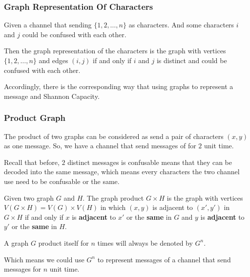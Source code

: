 \begin{frame}
      \frametitle{Graph Representation Of Characters}
      \begin{definition}\label{def:graphRepresetationOfChannel}
            Given a channel that sending $\{1,2,\dots,n\}$ as characters. And some characters $i$ and $j$ could be confused with each other.

            \smallskip

            Then the graph representation of the characters is the graph with vertices $\{1,2,\dots,n\}$ and edges $(i,j)$ if and only if $i$ and $j$ is distinct and could be confused with each other.
      \end{definition}

      Accordingly, there is the corresponding way that using graphs to represent a message and Shannon Capacity.
\end{frame}

\begin{frame}
      \frametitle{Product Graph}
      
      The product of two graphs can be considered as send a pair of characters $(x,y)$ as one message. So, we have a channel that send messages of for $2$ unit time.

      \pause
      \smallskip

      Recall that before, $2$ distinct messages is confusable means that they can be decoded into the same message, which means every characters the two channel use need to be confusable or the same.

      \begin{definition}\label{def:graphProduct}
            Given two graph $ G $ and $ H $. The graph product $ G \times H $ is the graph with vertices $ V(G \times H) = V(G) \times V(H) $ in which $ (x,y) $ is adjacent to $ (x',y') $ in $ G \times H $ if and only if $ x $ is \textbf{adjacent} to $ x' $ or the \textbf{same} in $ G $ and $ y $ is \textbf{adjacent} to $ y' $ or the \textbf{same} in $ H $.

            \pause

            A graph $ G $ product itself for $ n $ times will always be denoted by $ G^n $.

            Which means we could use $ G^n $ to represent messages of a channel that send messages for $n$ unit time.
      \end{definition}
\end{frame}


